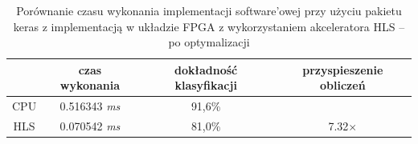 \begin{table}[h] \centering
  \caption{Porównanie czasu wykonania implementacji software'owej przy użyciu pakietu keras z implementacją w układzie FPGA z wykorzystaniem akceleratora HLS -- po optymalizacji} 
  \centering
  \begin{tabular} {c|c|c|c} \hline \label{tab:czas-wykonania2}
      
      & czas wykonania & dokładność klasyfikacji & przyspieszenie obliczeń\\ \hline
     CPU & 0.516343 \emph{ms} & 91,6\%  & \\
     HLS & 0.070542 \emph{ms} & 81,0\% & 7.32$\times$ \\
    \end{tabular}
  \end{table}